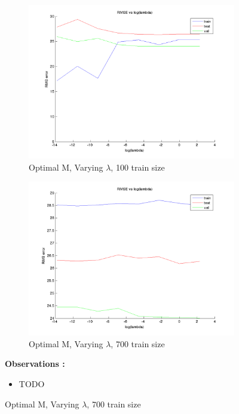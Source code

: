 \documentclass{article}
\begin{document}
\begin{figure}[H]
\begin{subfigure}{.5\textwidth}
\centering
\includegraphics[width=\linewidth]{D2/RMS_lambda_100}
\caption{Optimal M, Varying $\lambda$, 100 train size}
\end{subfigure}
\begin{subfigure}{.5\textwidth}
\includegraphics[width=\linewidth]{D2/RMS_lambda_700}
\caption{Optimal M, Varying $\lambda$, 700 train size}
\end{subfigure}


\textbf{Observations :}

\begin{itemize}
\item TODO
\end{itemize}


\end{figure}
\end{document}
